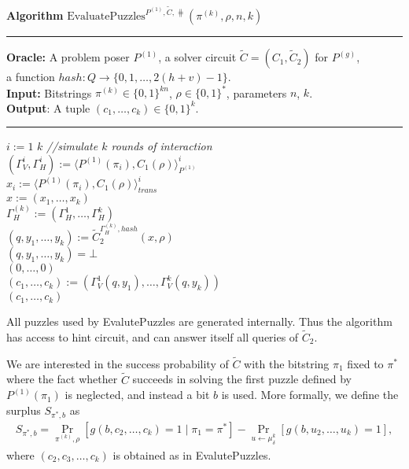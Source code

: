 \begin{codeblock}
  \textbf{Algorithm} $\text{EvaluatePuzzles}^{P^{(1)}, \widetilde{C}, \hash}(\pi^{(k)}, \rho, n, k)$
  \medskip \hrule \medskip
  \textbf{Oracle:}  A problem poser $P^{(1)}$, a solver circuit $\widetilde{C} = (C_1, \widetilde{C}_2)$ for $P^{(g)}$,\\
  \IndII a function $hash : Q \rightarrow \{0,1,\dots, 2(h+v)-1\}$.\\
  \textbf{Input:} Bitstrings $\pi^{(k)} \in \{0,1\}^{kn}$, $\rho \in \{0,1\}^{*}$, parameters $n$, $k$.\\
  \textbf{Output}: A tuple $(c_1, \dots, c_k) \in \{0,1\}^{k}$.
  \medskip\hrule\medskip
  \For $i:=1$ \To $k$ \Do \IndII \textit{//simulate $k$ rounds of interaction} \\
  \IndI $(\Gamma_V^{i}, \Gamma_H^{i}) := \langle P^{(1)}(\pi_i), C_1(\rho) \rangle_{P^{(1)}}^i$\\
  \IndI $x_i := \langle P^{(1)}(\pi_i), C_1(\rho) \rangle^i_{\mathit{trans}}$ \\
  $x := (x_1, \dots, x_k)$ \\
  $\Gamma_H^{(k)} := (\Gamma_H^1, \dotsc, \Gamma_H^k)$ \\
  $(q, y_1, \dots, y_k) := \widetilde{C}_2^{\Gamma_H^{(k)}, hash} (x, \rho)$ \\
  \If $(q, y_1, \dots, y_k) = \bot$ \Then \\
  \IndI \Return $(0, \dotsc, 0)$ \\
  $(c_1, \dotsc, c_k) := (\Gamma_V^{1}(q, y_1), \dotsc, \Gamma_V^{k}(q, y_k))$\\
  \Return $(c_1, \dotsc, c_k)$
\end{codeblock}
%
All puzzles used by EvalutePuzzles are generated internally. Thus the algorithm
has access to hint circuit, and can answer itself all queries of $\widetilde{C}_2$.

We are interested in the success probability of $\widetilde{C}$ with the bitstring $\pi_1$ fixed to $\pi^*$ where
the fact whether $\widetilde{C}$ succeeds in solving the first puzzle defined by $P^{(1)}(\pi_1)$ is neglected, and
instead a bit $b$ is used. More formally, we define the surplus $S_{\pi^*, b}$ as
\begin{align}
  \label{eq:s_pi_b}
S_{\pi^*, b} = \underset{\pi^{(k)}, \rho}{\Pr}\left[g(b, c_2, \dots, c_k) = 1 \mid \pi_1 = \pi^*\right] - \underset{u \leftarrow \mu^{k}_{\delta}}{\Pr}\left[g(b, u_2, \dots, u_k) = 1\right],
\end{align}
where $(c_2, c_3, \dotsc, c_k)$ is obtained as in EvalutePuzzles.


